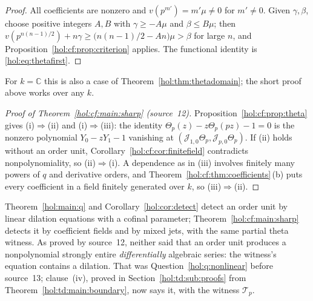 \documentclass[11pt]{article}
\numberwithin{equation}{section}
\theoremstyle{definition}
\theoremstyle{remark}
\newcommand{\C}{\mathbb C}
\newcommand{\jet}[2]{\mathcal J_{#1,#2}}
\begin{document}
\begin{proof}
All coefficients are nonzero and $v(p^{m'})=m'\mu\ne0$ for $m'\ne0$. Given
$\gamma,\beta$, choose positive integers $A,B$ with $\gamma\ge-A\mu$ and
$\beta\le B\mu$; then
$v(p^{n(n-1)/2})+n\gamma\ge\bigl(n(n-1)/2-An\bigr)\mu>\beta$ for large $n$,
and Proposition~\ref{hol:cf:prop:criterion} applies. The functional identity
is \eqref{hol:eq:thetafirst}.
\end{proof}

For $k=\C$ this is also a case of Theorem~\ref{hol:thm:thetadomain}; the
short proof above works over any $k$.

\begin{proof}[Proof of Theorem~\ref{hol:cf:main:sharp} \textup{(source~12)}]
Proposition~\ref{hol:cf:prop:theta} gives (i)$\Rightarrow$(ii) and
(i)$\Rightarrow$(iii): the identity $\Theta_p(z)-z\Theta_p(pz)-1=0$ is the
nonzero polynomial $Y_0-zY_1-1$ vanishing at $(\jet10\Theta_p,\jet p0\Theta_p)$.
If (ii) holds without an order unit, Corollary~\ref{hol:cf:cor:finitefield}
contradicts nonpolynomiality, so (ii)$\Rightarrow$(i). A dependence as in
(iii) involves finitely many powers of $q$ and derivative orders, and
Theorem~\ref{hol:cf:thm:coefficients}\,(b) puts every coefficient in a field
finitely generated over $k$, so (iii)$\Rightarrow$(ii).
\end{proof}

Theorem~\ref{hol:main:q} and Corollary~\ref{hol:cor:detect} detect an order
unit by linear dilation equations with a cofinal parameter;
Theorem~\ref{hol:cf:main:sharp} detects it by coefficient fields and by mixed
jets, with the same partial theta witness. As proved by source~12, neither
said that an order unit produces a nonpolynomial strongly entire
\emph{differentially} algebraic series: the witness's equation contains a
dilation. That was Question~\ref{hol:q:nonlinear} before source~13;
clause~(iv), proved in Section~\ref{hol:td:sub:proofs} from
Theorem~\ref{hol:td:main:boundary}, now says it, with the witness
$\mathcal T_p$.
\end{document}
